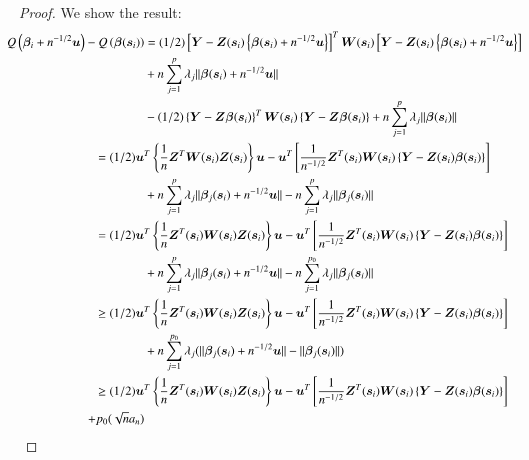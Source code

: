 \documentclass[authoryear, review, 11pt]{elsarticle}
\begin{document}
\begin{proof}
    We show the result:
    \begin{align}\label{eq:consistency}
      \mkern-18mu Q \left( \bm{\beta}_i + n^{-1/2} \bm{u} \right) - Q \left( \bm{\beta}(\bm{s}_i) \right) &= (1/2) \left[ \bm{Y} - \bm{Z}(\bm{s}_i) \left\{ \bm{\beta}(\bm{s}_i) + n^{-1/2} \bm{u} \right\} \right]^T \bm{W}(\bm{s}_i) \left[ \bm{Y} - \bm{Z}(\bm{s}_i) \left\{ \bm{\beta}(\bm{s}_i) + n^{-1/2} \bm{u} \right\} \right] \notag \\
      &+ n \sum_{j=1}^p \lambda_j \| \bm{\beta}(\bm{s}_i) + n^{-1/2} \bm{u} \| \notag \\
      &- (1/2) \left\{ \bm{Y} - \bm{Z} \bm{\beta}(\bm{s}_i) \right\}^T \bm{W}(\bm{s}_i) \left\{ \bm{Y} - \bm{Z} \bm{\beta}(\bm{s}_i) \right\} + n \sum_{j=1}^p \lambda_j \| \bm{\beta}(\bm{s}_i) \| \notag \\ 
      &\mkern-72mu= (1/2) \bm{u}^T \left\{ \frac{1}{n} \bm{Z}^T \bm{W}(\bm{s}_i) \bm{Z}(\bm{s}_i) \right\} \bm{u} - \bm{u}^T \left[ \frac{1}{n^{-1/2}} \bm{Z}^T(\bm{s}_i) \bm{W}(\bm{s}_i) \left\{ \bm{Y} - \bm{Z}(\bm{s}_i) \bm{\beta}(\bm{s}_i) \right\} \right] \notag \\
      &+ n \sum_{j=1}^p \lambda_j \|\bm{\beta}_j(\bm{s}_i) + n^{-1/2} \bm{u} \| - n \sum_{j=1}^p \lambda_j \| \bm{\beta}_j(\bm{s}_i) \| \notag \\
      &\mkern-72mu= (1/2) \bm{u}^T \left\{ \frac{1}{n} \bm{Z}^T(\bm{s}_i) \bm{W}(\bm{s}_i) \bm{Z}(\bm{s}_i) \right\} \bm{u} - \bm{u}^T \left[ \frac{1}{n^{-1/2}} \bm{Z}^T(\bm{s}_i) \bm{W}(\bm{s}_i) \left\{ \bm{Y} - \bm{Z}(\bm{s}_i) \bm{\beta}(\bm{s}_i) \right\} \right] \notag \\
      &+ n \sum_{j=1}^p \lambda_j \|\bm{\beta}_j(\bm{s}_i) + n^{-1/2} \bm{u} \| - n \sum_{j=1}^{p_0} \lambda_j \| \bm{\beta}_j(\bm{s}_i) \| \notag \\
      &\mkern-72mu\ge (1/2) \bm{u}^T \left\{ \frac{1}{n} \bm{Z}^T(\bm{s}_i) \bm{W}(\bm{s}_i) \bm{Z}(\bm{s}_i) \right\} \bm{u} - \bm{u}^T \left[ \frac{1}{n^{-1/2}} \bm{Z}^T(\bm{s}_i) \bm{W}(\bm{s}_i) \left\{ \bm{Y} - \bm{Z}(\bm{s}_i) \bm{\beta}(\bm{s}_i) \right\} \right] \notag \\
      &+ n \sum_{j=1}^{p_0} \lambda_j ( \|\bm{\beta}_j(\bm{s}_i) + n^{-1/2} \bm{u} \| - \| \bm{\beta}_j(\bm{s}_i) \| ) \notag \\
      &\mkern-72mu\ge (1/2) \bm{u}^T \left\{ \frac{1}{n} \bm{Z}^T(\bm{s}_i) \bm{W}(\bm{s}_i) \bm{Z}(\bm{s}_i) \right\} \bm{u} - \bm{u}^T \left[ \frac{1}{n^{-1/2}} \bm{Z}^T(\bm{s}_i) \bm{W}(\bm{s}_i) \left\{ \bm{Y} - \bm{Z}(\bm{s}_i) \bm{\beta}(\bm{s}_i) \right\} \right] \notag \\
      + p_0 ( \sqrt{n} a_n )
    \end{align}
  \end{proof}
\end{document}
